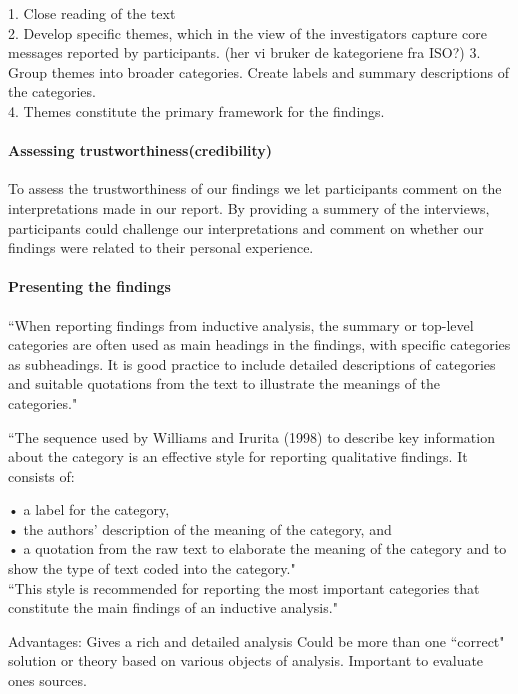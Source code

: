 1. Close reading of the text\\
2. Develop specific themes, which in the view of the investigators capture core\\ messages reported by participants. (her vi bruker de kategoriene fra ISO?)
3. Group themes into broader categories. Create labels and summary descriptions of the categories.\\
4. Themes constitute the primary framework for the findings.


\paragraph{Assessing trustworthiness(credibility)} To assess the trustworthiness of our findings we let participants comment on the interpretations made in our report. By providing a summery of the interviews, participants could challenge our interpretations and comment on whether our findings were related to their personal experience.

\paragraph{Presenting the findings}
``When reporting findings from inductive analysis, the summary or top-level categories are often used as main headings in the findings, with specific categories as subheadings. It is good practice to include detailed descriptions of categories and suitable quotations from the text to illustrate the meanings of the categories."

``The sequence used by Williams and Irurita (1998) to describe key information about the category is an effective style for reporting qualitative findings. It consists of:

• a label for the category,\\
• the authors’ description of the meaning of the category, and\\
• a quotation from the raw text to elaborate the meaning of the category and to show the type of text coded into the category."\\

``This style is recommended for reporting the most important categories that constitute the main findings of an inductive analysis."

Advantages:
Gives a rich and detailed analysis
Could be more than one ``correct" solution or theory based on various objects of analysis.
Important to evaluate ones sources.


